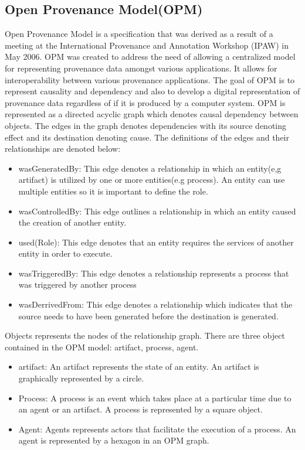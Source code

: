 \subsection{Open Provenance Model(OPM)}

Open Provenance Model \cite{moreau_open_2011} is a specification that was derived as a result of a meeting at the International Provenance and Annotation Workshop (IPAW) in May 2006. OPM was created to address the need of allowing a centralized model for representing provenance data amongst various applications. It allows for interoperability between various provenance applications. The goal of OPM is to represent causality and dependency and also to develop a digital representation of provenance data regardless of if it is produced by a computer system. OPM is represented as a directed acyclic graph which denotes causal dependency between objects. The edges in the graph denotes dependencies with its source denoting effect and its destination denoting cause. The definitions of the edges and their relationships are denoted below: 

\begin{itemize}
\item wasGeneratedBy: This edge denotes a  relationship in which an entity(e,g artifact) is utilized by one or  more entities(e.g process). An entity can use multiple entities so it is important to define the role.  
\item wasControlledBy: This edge outlines a relationship in which an entity caused the creation of another entity.
\item used(Role): This edge denotes that an entity requires the services of another entity in order to execute.
\item wasTriggeredBy: This edge denotes a relationship represents a process that was triggered by another process
\item wasDerrivedFrom: This edge denotes a relationship which indicates that the source needs to have been generated before the destination is generated.
\end{itemize}

 Objects represents the nodes of the relationship graph. There are three object contained in the OPM model: artifact, process, agent. 

\begin{itemize}
\item
artifact: An artifact represents the state of an entity. An artifact is graphically represented by a circle.

\item
Process: A process is an event which takes place at a particular time due to an agent or an artifact. A process is represented by a square object.

\item 
Agent: Agents represents actors that facilitate the execution of a process. An agent is represented by a hexagon in an OPM graph.
\end{itemize}

